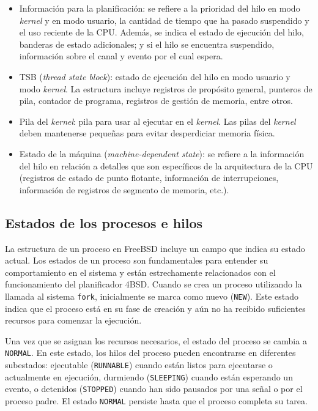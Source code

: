 \begin{itemize}
    \item Información para la planificación: se refiere a la prioridad del hilo en modo \textit{kernel} y en modo usuario, la cantidad de tiempo que ha pasado suspendido y el uso reciente de la CPU. Además, se indica el estado de ejecución del hilo, banderas de estado adicionales; y si el hilo se encuentra suspendido, información sobre el canal y evento por el cual espera.
    \item TSB (\textit{thread state block}): estado de ejecución del hilo en modo usuario y modo \textit{kernel}. La estructura incluye registros de propósito general, punteros de pila, contador de programa, registros de gestión de memoria, entre otros.
    \item Pila del \textit{kernel}: pila para usar al ejecutar en el \textit{kernel}. Las pilas del \textit{kernel} deben mantenerse pequeñas para evitar desperdiciar memoria física.
    \item Estado de la máquina (\textit{machine-dependent state}): se refiere a la información del hilo en relación a detalles que son específicos de la arquitectura de la CPU (registros de estado de punto flotante, información de interrupciones, información de registros de segmento de memoria, etc.).
\end{itemize}

\subsection{Estados de los procesos e hilos}

La estructura de un proceso en FreeBSD incluye un campo que indica su estado actual. Los estados de un proceso son fundamentales para entender su comportamiento en el sistema y están estrechamente relacionados con el funcionamiento del planificador 4BSD. Cuando se crea un proceso utilizando la llamada al sistema \texttt{fork}, inicialmente se marca como nuevo (\texttt{NEW}). Este estado indica que el proceso está en su fase de creación y aún no ha recibido suficientes recursos para comenzar la ejecución.

Una vez que se asignan los recursos necesarios, el estado del proceso se cambia a \texttt{NORMAL}. En este estado, los hilos del proceso pueden encontrarse en diferentes subestados: ejecutable (\texttt{RUNNABLE}) cuando están listos para ejecutarse o actualmente en ejecución, durmiendo (\texttt{SLEEPING}) cuando están esperando un evento, o detenidos (\texttt{STOPPED}) cuando han sido pausados por una señal o por el proceso padre. El estado \texttt{NORMAL} persiste hasta que el proceso completa su tarea.

